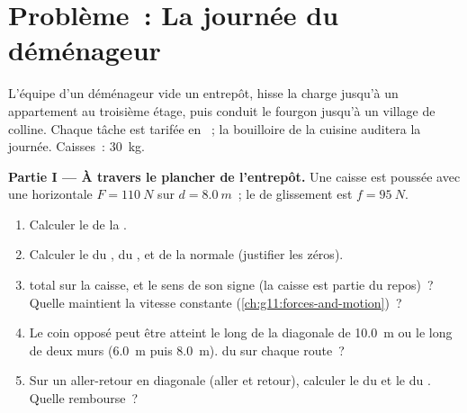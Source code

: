 \section{Problème~: La journée du déménageur}

\begin{problem}
\label{pb:g11:work-of-force:1}
L'équipe d'un déménageur vide un entrepôt, hisse la charge jusqu'à un
appartement au troisième étage, puis conduit le fourgon jusqu'à un
village de colline. Chaque tâche est tarifée en
~; la bouilloire de la cuisine
auditera la journée. Caisses~: \qty{30}{kg}.

\medskip
\noindent\textbf{Partie I --- À travers le plancher de l'entrepôt.}
Une caisse est poussée avec une
 horizontale $F = \qty{110}{N}$ sur
$d = \qty{8.0}{m}$~; le  de
glissement est $f = \qty{95}{N}$.
\begin{enumerate}
  \item Calculer le  de la .
  \item Calculer le  du
        , du
        , et de la
         normale (justifier les
        zéros).
  \item {} total sur la caisse, et
        le sens de son signe (la caisse est partie du repos)~? Quelle
         maintient la vitesse constante
        (\cref{ch:g11:forces-and-motion})~?
  \item Le coin opposé peut être atteint le long de la diagonale de
        \qty{10.0}{m} ou le long de deux murs (\qty{6.0}{m} puis
        \qty{8.0}{m}).  du
         sur chaque route~?
  \item Sur un aller-retour en diagonale (aller et retour), calculer le
         du
         et le
         du
        . Quelle
         rembourse~?
\end{enumerate}


\end{problem}
